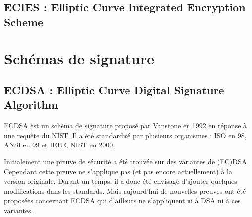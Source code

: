 \subsection{ECIES : Elliptic Curve Integrated Encryption Scheme}


\section{Schémas de signature}
\subsection{ECDSA : Elliptic Curve Digital Signature Algorithm}
ECDSA est un schéma de signature proposé par Vanstone en 1992 en réponse à une requête du NIST. Il a été standardisé par plusieurs organismes : ISO en 98, ANSI en 99 et IEEE, NIST en 2000.

Initialement une preuve de sécurité a été trouvée sur des variantes de (EC)DSA. Cependant cette preuve ne s'applique pas (et pas encore actuellement) à la version originale. Durant un temps, il a donc été envisagé d'ajouter quelques modifications dans les standards. Mais aujourd'hui de nouvelles preuves ont été proposées concernant ECDSA qui d'ailleurs ne s'appliquent ni à DSA ni à ces variantes.



